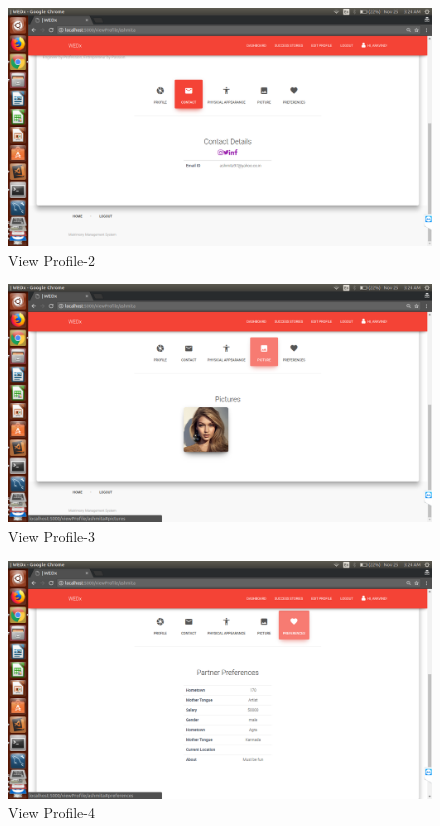 \documentclass[12pt]{report}
\begin{document}
\begin{figure}[!htb]
    \centering
    \includegraphics[width=1\textwidth]{sc-13.png}
    \caption{View Profile-2}
    \label{fig:View Profile-2}
\end{figure}

\begin{figure}[!htb]
    \centering
    \includegraphics[width=1\textwidth]{sc-14.png}
    \caption{View Profile-3}
    \label{fig:View Profile-3}
\end{figure}

\begin{figure}[!htb]
    \centering
    \includegraphics[width=1\textwidth]{sc-15.png}
    \caption{View Profile-4}
    \label{fig:View Profile-4}
\end{figure}
\end{document}
